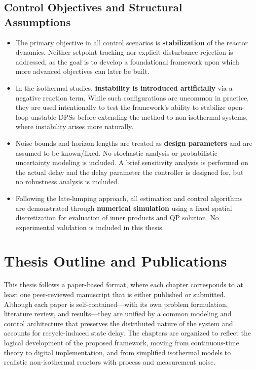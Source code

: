 \subsection*{Control Objectives and Structural Assumptions}

\begin{itemize}
    \item The primary objective in all control scenarios is \textbf{stabilization} of the reactor dynamics. Neither setpoint tracking nor explicit disturbance rejection is addressed, as the goal is to develop a foundational framework upon which more advanced objectives can later be built.

    \item In the isothermal studies, \textbf{instability is introduced artificially} via a negative reaction term. While such configurations are uncommon in practice, they are used intentionally to test the framework’s ability to stabilize open-loop unstable DPSs before extending the method to non-isothermal systems, where instability arises more naturally.

    \item Noise bounds and horizon lengths are treated as \textbf{design parameters} and are assumed to be known/fixed. No stochastic analysis or probabilistic uncertainty modeling is included. A brief sensitivity analysis is performed on the actual delay and the delay parameter the controller is designed for, but no robustness analysis is included.

    \item Following the late-lumping approach, all estimation and control algorithms are demonstrated through \textbf{numerical simulation} using a fixed spatial discretization for evaluation of inner products and QP solution. No experimental validation is included in this thesis.
\end{itemize}


\section{Thesis Outline and Publications}

This thesis follows a paper-based format, where each chapter corresponds to at least one peer-reviewed manuscript that is either published or submitted. Although each paper is self-contained—with its own problem formulation, literature review, and results—they are unified by a common modeling and control architecture that preserves the distributed nature of the system and accounts for recycle-induced state delay. The chapters are organized to reflect the logical development of the proposed framework, moving from continuous-time theory to digital implementation, and from simplified isothermal models to realistic non-isothermal reactors with process and measurement noise.

